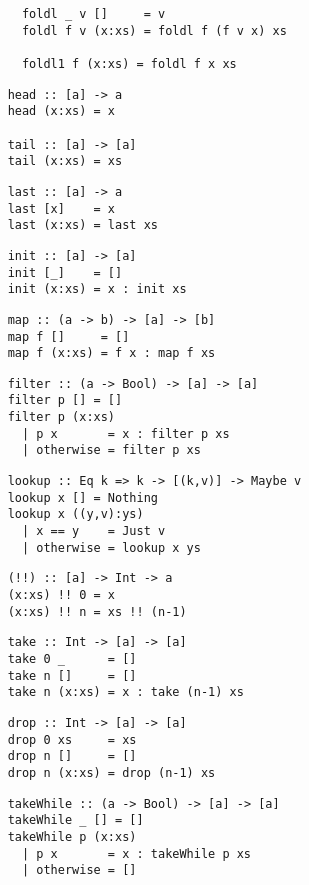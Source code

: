 \begin{multicols}{2}
\begin{verbatim}
	  foldl _ v []     = v 
	  foldl f v (x:xs) = foldl f (f v x) xs
	  
	  foldl1 f (x:xs) = foldl f x xs
	\end{verbatim}
	
	\begin{verbatim}
	head :: [a] -> a 
	head (x:xs) = x
	
	tail :: [a] -> [a]
	tail (x:xs) = xs
	\end{verbatim}
	
	\begin{verbatim}
	last :: [a] -> a
	last [x]    = x
	last (x:xs) = last xs
	\end{verbatim}
	
	\begin{verbatim}
	init :: [a] -> [a]
	init [_]    = []
	init (x:xs) = x : init xs
	\end{verbatim}
	
	\begin{verbatim}
	map :: (a -> b) -> [a] -> [b]
	map f []     = []
	map f (x:xs) = f x : map f xs
	\end{verbatim}
	
	\begin{verbatim}
	filter :: (a -> Bool) -> [a] -> [a]
	filter p [] = []
	filter p (x:xs)
	  | p x       = x : filter p xs
	  | otherwise = filter p xs
	\end{verbatim}
	
	\begin{verbatim}
	lookup :: Eq k => k -> [(k,v)] -> Maybe v
	lookup x [] = Nothing
	lookup x ((y,v):ys)
	  | x == y    = Just v
	  | otherwise = lookup x ys
	\end{verbatim}
	
	\begin{verbatim}
	(!!) :: [a] -> Int -> a
	(x:xs) !! 0 = x
	(x:xs) !! n = xs !! (n-1)
	\end{verbatim}
	
	\begin{verbatim}
	take :: Int -> [a] -> [a]
	take 0 _      = []
	take n []     = []
	take n (x:xs) = x : take (n-1) xs
	\end{verbatim}
	
	\begin{verbatim}
	drop :: Int -> [a] -> [a]
	drop 0 xs     = xs 
	drop n []     = []
	drop n (x:xs) = drop (n-1) xs
	\end{verbatim}
	
	\begin{verbatim}
	takeWhile :: (a -> Bool) -> [a] -> [a]
	takeWhile _ [] = []
	takeWhile p (x:xs) 
	  | p x       = x : takeWhile p xs
	  | otherwise = []
	\end{verbatim}
	

\end{multicols}
